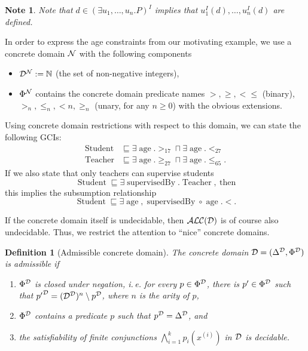 \documentclass[openany]{scrbook}
\theoremstyle{break}
\newtheorem{Definition}[Theorem]{Definition}
\theoremstyle{nonumberbreak}
\theoremstyle{nonumberplain}
\newtheorem{Note}{Note}
\theoremstyle{nonumberbreak}
\newcommand{\N}{\mathbb{N}}
\newcommand{\ie}{i{.}\,e{.}\xspace}
\newcommand{\ALC}{{\cal A}{\cal L}{\cal C}}
\begin{document}
\begin{Note}
  Note that $d \in (\exists u_1, \dotsc, u_n. P)^I$ implies that
  $u_1^I(d), \dotsc, u_n^I(d)$ are defined.
\end{Note}

In order to express the age constraints from our motivating example,
we use a concrete domain ${\cal N}$ with the following components
\begin{itemize}
\item ${\cal D}^{\cal N} := \N$ (the set of non-negative integers),
\item $\Phi^{\cal N}$ contains the concrete domain predicate names $>,
  \geq, < \leq$ (binary), $>_n, \leq_n, <n, \geq_n$ (unary, for any $n
  \geq 0$) with the obvious extensions.
\end{itemize}

Using concrete domain restrictions with respect to this domain, we can
state the following GCIs:
\begin{align*}
  \operatorname{Student} & \sqsubseteq \exists
  \operatorname{age}. >_{17} \sqcap \exists
  \operatorname{age}. <_{27} \\
  \operatorname{Teacher} & \sqsubseteq \exists
  \operatorname{age}. \geq_{27} \sqcap \exists
  \operatorname{age}. \leq_{65}.
\end{align*}
If we also state that only teachers can supervise students
\begin{equation*}
  \operatorname{Student} \sqsubseteq \exists
  \operatorname{supervisedBy}. \operatorname{Teacher},\ \text{then}
\end{equation*}
this implies the subsumption relationship
\begin{equation*}
  \operatorname{Student} \sqsubseteq \exists \operatorname{age},
  \operatorname{supervisedBy} \circ \operatorname{age}. <.
\end{equation*}

If the concrete domain itself is undecidable, then $\ALC({\cal D})$ is
of course also undecidable. Thus, we restrict the attention to
``nice'' concrete domains.

\begin{Definition}[Admissible concrete domain]
  \label{7.8}
  The concrete domain ${\cal D} = (\Delta^{\cal D}, \Phi^{\cal D})$ is
  admissible if
  \begin{enumerate}
  \item $\Phi^{\cal D}$ is closed under negation, \ie for every $p \in
    \Phi^{\cal D}$, there is $p' \in \Phi^{\cal D}$ such that
    ${p'}^{\cal D} = ({\cal D}^{\cal D})^n \setminus p^{\cal D}$,
    where $n$ is the arity of $p$,
  \item $\Phi^{\cal D}$ contains a predicate $p$ such that $p^{\cal D}
    = \Delta^{\cal D}$, and
  \item the satisfiability of finite conjunctions $\bigwedge_{i =
      1}^k{p_i(x^{(i)})}$ in ${\cal D}$ is decidable.
  \end{enumerate}
\end{Definition}
\end{document}
